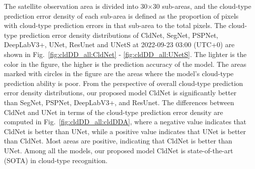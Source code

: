 \documentclass[review]{elsarticle}
\begin{document}
The satellite observation area is divided into 30$\times$30 sub-areas, and the cloud-type prediction error density of each sub-area is defined as the proportion of pixels with cloud-type prediction errors in that sub-area to the total pixels.
The cloud-type prediction error density distributions of CldNet, SegNet, PSPNet, DeepLabV3+, UNet, ResUnet and UNetS at 2022-09-23 03:00 (UTC+0) are shown in Fig.~\ref{fig:cldDD_all:CldNet} - \ref{fig:cldDD_all:UNetS}.
The lighter is the color in the figure, the higher is the prediction accuracy of the model.
The areas marked with circles in the figure are the areas where the model's cloud-type prediction ability is poor.
From the perspective of overall cloud-type prediction error density distributions, our proposed model CldNet is significantly better than SegNet, PSPNet, DeepLabV3+, and ResUnet.
The differences between CldNet and UNet in terms of the cloud-type prediction error density are computed in Fig.~\ref{fig:cldDD_all:cldDDA}, where a negative value indicates that CldNet is better than UNet, while a positive value indicates that UNet is better than CldNet.
Most areas are positive, indicating that CldNet is better than UNet.
Among all the models, our proposed model CldNet is state-of-the-art (SOTA) in cloud-type recognition.
\end{document}
